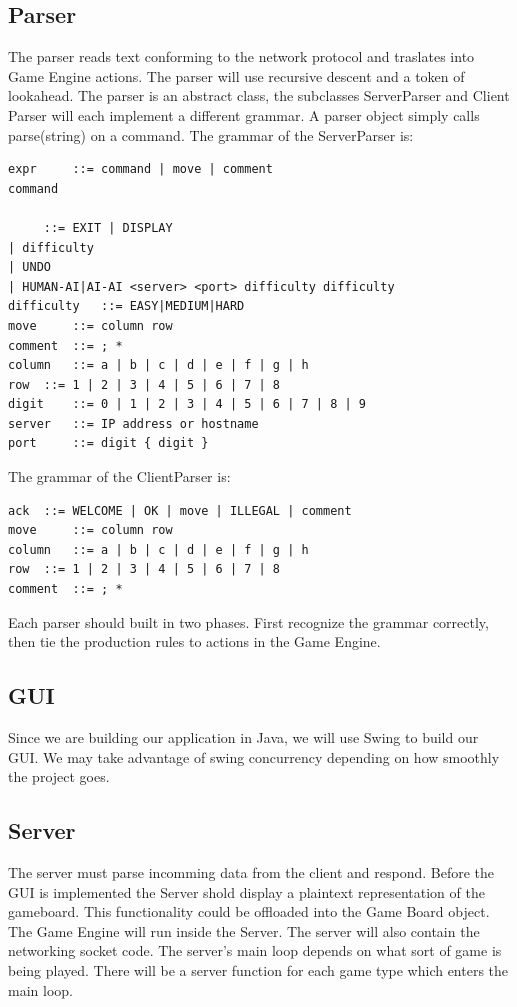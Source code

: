 \documentclass{article}
\begin{document}
\subsection{Parser}
The parser reads text conforming to the network protocol and traslates into Game Engine actions.
The parser will use recursive descent and a token of lookahead. The parser is an abstract class,
the subclasses ServerParser and Client Parser will each implement a different grammar. A parser
object simply calls parse(string) on a command.
The grammar of the ServerParser is:
\begin{verbatim}
expr     ::= command | move | comment
command 
  
 	 ::= EXIT | DISPLAY 
| difficulty 
| UNDO 
| HUMAN-AI|AI-AI <server> <port> difficulty difficulty
difficulty	 ::= EASY|MEDIUM|HARD
move	 ::= column row
comment	 ::= ; *
column	 ::= a | b | c | d | e | f | g | h
row	 ::= 1 | 2 | 3 | 4 | 5 | 6 | 7 | 8
digit	 ::= 0 | 1 | 2 | 3 | 4 | 5 | 6 | 7 | 8 | 9
server	 ::= IP address or hostname
port	 ::= digit { digit }
\end{verbatim}

\vspace{10 mm}
The grammar of the ClientParser is:
\begin{verbatim}
ack	 ::= WELCOME | OK | move | ILLEGAL | comment
move	 ::= column row
column	 ::= a | b | c | d | e | f | g | h
row	 ::= 1 | 2 | 3 | 4 | 5 | 6 | 7 | 8
comment	 ::= ; *
\end{verbatim}

Each parser should built in two phases. First recognize the grammar correctly, then 
tie the production rules to actions in the Game Engine.


\subsection{GUI}
Since we are building our application in Java, we will use Swing to build 
our GUI. We may take advantage of swing concurrency depending on how 
smoothly the project goes. 

\subsection{Server}
The server must parse incomming data from the client and respond.
Before the GUI is implemented the Server shold display a plaintext representation 
of the gameboard. This functionality could be offloaded into the Game Board object.
The Game Engine will run inside the Server. The server will also contain the networking
socket code. The server's main loop depends on what sort of game is being played. There 
will be a server function for each game type which enters the main loop.
\end{document}

